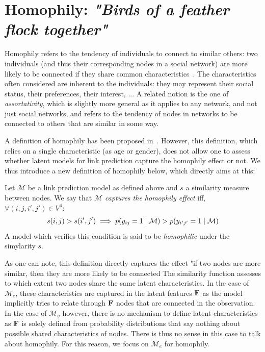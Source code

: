 \section{Homophily: \emph{"Birds of a feather flock together"}}
\label{sec:homophily}

Homophily refers to the tendency of individuals to connect to similar others: two individuals (and thus their corresponding nodes in a social network) are more likely to be connected if they share common characteristics~\cite{mcpherson2001birds,lazarsfeld1954friendship}. The characteristics often considered are inherent to the individuals: they may represent their social status, their preferences, their interest, ... A related notion is the one of {\it assortativity}, which is slightly more general as it applies to any network, and not just social networks, and refers to the tendency of nodes in networks to be connected to others that are similar in some way.

A definition of homophily has been proposed in~\cite{la2010randomization}. However, this definition, which relies on a single characteristic (as age or gender), does not allow one to assess whether latent models for link prediction capture the homophily effect or not. We thus introduce a new definition of homophily below, which directly aims at this:
%
\begin{definition}[Homophily]
	Let $\mathcal{M}$ be a link prediction model as defined above and $s$ a similarity measure between nodes. We say that \emph{$\mathcal{M}$ captures the homophily effect} iff, $\forall (i,j,i',j') \in V^4$:
%
\begin{equation}
s(i,j) > s(i',j')  \implies p(y_{ij}=1 \mid \mathcal{M}) > p(y_{i'j'}=1  \mid \mathcal{M}) \nonumber
\end{equation}
%
A model which verifies this condition is said to be \emph{homophilic} under the simylarity $s$.
\end{definition}
%
As one can note, this definition directly captures the effect "if two nodes are more similar, then they are more likely to be connected The similarity function assesses to which extent two nodes share the same latent characteristics. In the case of $\mathcal{M}_e$, these characteristics are captured in the latent features $\mathbf{F}$ as the model implicitly tries to relate through $\mathbf{F}$ nodes that are connected in the observation. In the case of $\mathcal{M}_g$ however, there is no mechanism to define latent characteristics as $\mathbf{F}$ is solely defined from probability distributions that say nothing about possible shared characteristics of nodes. There is thus no sense in this case to talk about homophily. For this reason, we focus on $\mathcal{M}_e$ for homophily. 

